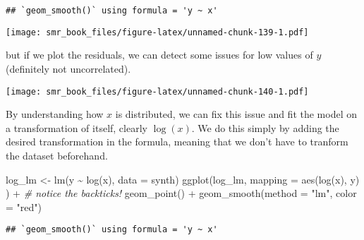 \documentclass[
  oneside]{book}
\newenvironment{Shaded}{\begin{snugshade}}{\end{snugshade}}
\newcommand{\AttributeTok}[1]{\textcolor[rgb]{0.77,0.63,0.00}{#1}}
\newcommand{\CommentTok}[1]{\textcolor[rgb]{0.56,0.35,0.01}{\textit{#1}}}
\newcommand{\FunctionTok}[1]{\textcolor[rgb]{0.00,0.00,0.00}{#1}}
\newcommand{\NormalTok}[1]{#1}
\newcommand{\OtherTok}[1]{\textcolor[rgb]{0.56,0.35,0.01}{#1}}
\newcommand{\SpecialCharTok}[1]{\textcolor[rgb]{0.00,0.00,0.00}{#1}}
\newcommand{\StringTok}[1]{\textcolor[rgb]{0.31,0.60,0.02}{#1}}
\begin{document}
\begin{verbatim}
## `geom_smooth()` using formula = 'y ~ x'
\end{verbatim}

\texttt{[image: smr\_book\_files/figure-latex/unnamed-chunk-139-1.pdf]}

but if we plot the residuals, we can detect some issues for low
values of \(y\) (definitely not uncorrelated).

\begin{Shaded}
\end{Shaded}

\texttt{[image: smr\_book\_files/figure-latex/unnamed-chunk-140-1.pdf]}

By understanding how \(x\) is distributed, we can fix this issue
and fit the model on a transformation of itself, clearly \(\log(x)\).
We do this simply by adding the desired transformation in the
formula, meaning that we don't have to tranform the dataset beforehand.

\begin{Shaded}
\begin{Highlighting}[]
\NormalTok{log\_lm }\OtherTok{\textless{}{-}} \FunctionTok{lm}\NormalTok{(y }\SpecialCharTok{\textasciitilde{}} \FunctionTok{log}\NormalTok{(x), }\AttributeTok{data =}\NormalTok{ synth)}
\FunctionTok{ggplot}\NormalTok{(log\_lm,}
  \AttributeTok{mapping =} \FunctionTok{aes}\NormalTok{(}\StringTok{\textasciigrave{}}\AttributeTok{log(x)}\StringTok{\textasciigrave{}}\NormalTok{, y)}
\NormalTok{) }\SpecialCharTok{+} \CommentTok{\# notice the backticks!}
  \FunctionTok{geom\_point}\NormalTok{() }\SpecialCharTok{+}
  \FunctionTok{geom\_smooth}\NormalTok{(}\AttributeTok{method =} \StringTok{"lm"}\NormalTok{, }\AttributeTok{color =} \StringTok{"red"}\NormalTok{)}
\end{Highlighting}
\end{Shaded}

\begin{verbatim}
## `geom_smooth()` using formula = 'y ~ x'
\end{verbatim}
\end{document}
